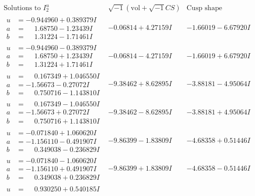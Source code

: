 \documentclass[1p]{elsarticle_modified}
\theoremstyle{definition}
\newcommand{\I}{\sqrt{-1}}
\begin{document}
$$\begin{array}{c|c|c}  
\text{Solutions to }I^u_{2}& \I (\text{vol} + \sqrt{-1}CS) & \text{Cusp shape}\\
 \hline 
\begin{aligned}
u &= -0.944960 + 0.389379 I \\
a &= \phantom{-}1.68750 - 1.23439 I \\
b &= \phantom{-}1.31224 - 1.71461 I\end{aligned}
 & -0.06814 + 4.27159 I & -1.66019 - 6.67920 I \\ \hline\begin{aligned}
u &= -0.944960 - 0.389379 I \\
a &= \phantom{-}1.68750 + 1.23439 I \\
b &= \phantom{-}1.31224 + 1.71461 I\end{aligned}
 & -0.06814 - 4.27159 I & -1.66019 + 6.67920 I \\ \hline\begin{aligned}
u &= \phantom{-}0.167349 + 1.046550 I \\
a &= -1.56673 - 0.27072 I \\
b &= \phantom{-}0.750716 - 1.143810 I\end{aligned}
 & -9.38462 + 8.62895 I & -3.88181 - 4.95064 I \\ \hline\begin{aligned}
u &= \phantom{-}0.167349 - 1.046550 I \\
a &= -1.56673 + 0.27072 I \\
b &= \phantom{-}0.750716 + 1.143810 I\end{aligned}
 & -9.38462 - 8.62895 I & -3.88181 + 4.95064 I \\ \hline\begin{aligned}
u &= -0.071840 + 1.060620 I \\
a &= -1.156110 - 0.491907 I \\
b &= \phantom{-}0.349038 - 0.236829 I\end{aligned}
 & -9.86399 - 1.83809 I & -4.68358 + 0.51446 I \\ \hline\begin{aligned}
u &= -0.071840 - 1.060620 I \\
a &= -1.156110 + 0.491907 I \\
b &= \phantom{-}0.349038 + 0.236829 I\end{aligned}
 & -9.86399 + 1.83809 I & -4.68358 - 0.51446 I \\ \hline\begin{aligned}
u &= \phantom{-}0.930250 + 0.540185 I \\

\end{aligned}
\end{array}$$
\end{document}

